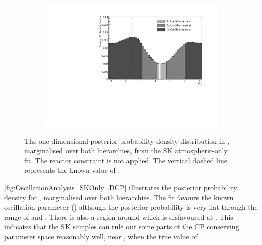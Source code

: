 \begin{figure}[h]
  \begin{subfigure}[t]{0.98\textwidth}
    \includegraphics[width=\textwidth, trim={0mm 0mm 0mm 0mm}, clip,page=1]{Figures/OA/SKOnlyFit/Contours_1D_dcp_BH_1_woRC_UnSmeared_CredibleInterval.pdf}
  \end{subfigure}
  \caption{The one-dimensional posterior probability density distribution in , marginalised over both hierarchies, from the SK atmospheric-only fit. The reactor constraint is not applied. The vertical dashed line represents the known value of .}
  \label{fig:OscillationAnalysis_SKOnly_DCP}
\end{figure}

\autoref{fig:OscillationAnalysis_SKOnly_DCP} illustrates the posterior probability density for , marginalised over both hierarchies.
The fit favours the known oscillation parameter () although the posterior probability is very flat through the range of  and . There is also a region around  which is disfavoured at \quickmath{2\sigma}. This indicates that the SK samples can rule out some parts of the CP conserving parameter space reasonably well, near , when the true value of .


